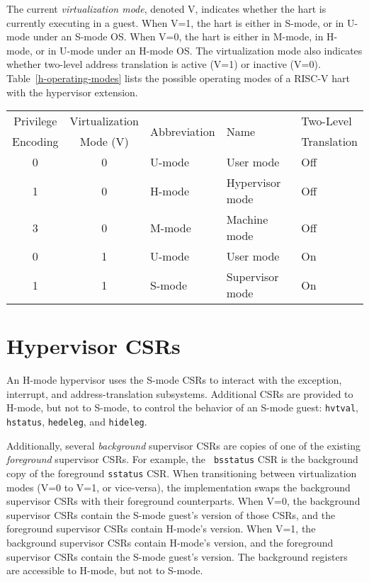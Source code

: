 The current {\em virtualization mode}, denoted V, indicates whether the hart
is currently executing in a guest.  When V=1, the hart is either in S-mode, or
in U-mode under an S-mode OS.  When V=0, the hart is either in M-mode, in
H-mode, or in U-mode under an H-mode OS.  The virtualization mode also
indicates whether two-level address translation is active (V=1) or inactive
(V=0).  Table~\ref{h-operating-modes} lists the possible operating modes of
a RISC-V hart with the hypervisor extension.

\begin{table*}[h!]
\begin{center}
\begin{tabular}{|c|c||l|l|l|}
  \hline
   Privilege & Virtualization & \multirow{2}{*}{Abbreviation} & \multirow{2}{*}{Name} & Two-Level \\
   Encoding  & Mode (V)       &                               &                       & Translation \\ \hline
   0         & 0              & U-mode  & User mode & Off \\
   1         & 0              & H-mode  & Hypervisor mode & Off \\
   3         & 0              & M-mode  & Machine mode & Off \\
   0         & 1              & U-mode  & User mode & On \\
   1         & 1              & S-mode  & Supervisor mode & On \\
  \hline
 \end{tabular}
\end{center}
\caption{Operating modes with the hypervisor extension.}
\label{h-operating-modes}
\end{table*}

\section{Hypervisor CSRs}

An H-mode hypervisor uses the S-mode CSRs to interact with the exception,
interrupt, and address-translation subsystems.
Additional CSRs are provided to H-mode, but not to S-mode, to control
the behavior of an S-mode guest:
{\tt hvtval}, {\tt hstatus}, {\tt hedeleg}, and
{\tt hideleg}.

Additionally, several {\em background} supervisor CSRs are copies of one of
the existing {\em foreground} supervisor CSRs.  For example, the {\tt
bsstatus} CSR is the background copy of the foreground {\tt sstatus} CSR.
When transitioning between virtualization modes (V=0 to V=1, or vice-versa),
the implementation swaps the background supervisor CSRs with their foreground
counterparts.  When V=0, the background supervisor CSRs contain the S-mode
guest's version of those CSRs, and the foreground supervisor CSRs contain
H-mode's version.  When V=1, the background supervisor CSRs contain H-mode's
version, and the foreground supervisor CSRs contain the S-mode guest's
version.  The background registers are accessible to H-mode, but not to S-mode.

